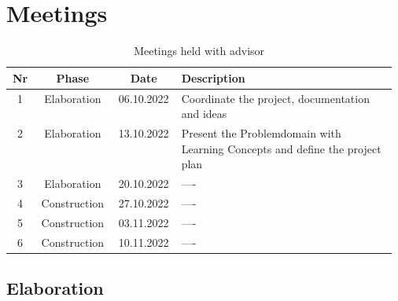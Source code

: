 \chapter{Meetings}
\label{meeting_chapter}

\begin{table}[H]
    \centering
    \begin{tabular}{| c | c | c | p{0.57\linewidth} |}
        \hline 
        Nr & Phase & Date & Description \\
        \hline \hline
        1 & Elaboration & 06.10.2022 & Coordinate the project, documentation \- and ideas \\
        \hline
        2 & Elaboration & 13.10.2022 & Present the Problemdomain with Learning Concepts and define the project plan \\
        \hline
        3 & Elaboration & 20.10.2022 & ---- \\
        \hline
        4 & Construction & 27.10.2022 & ---- \\
        \hline
        5 & Construction & 03.11.2022 & ---- \\
        \hline
        6 & Construction & 10.11.2022 & ---- \\
        \hline
    \end{tabular}
    \caption{Meetings held with advisor}
    \label{meetings_hold_table}
\end{table}
\section{Elaboration}
